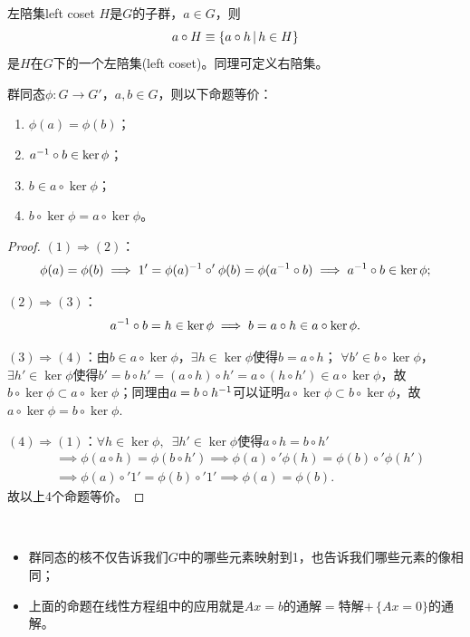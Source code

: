 \begin{definition}{左陪集}{left coset}
	$H$是$G$的子群，$a \in G$，则
	\begin{equation}
		a \circ H \equiv \{a \circ h\,\vert\,h \in H\}
	\end{equation}
	是$H$在$G$下的一个左陪集(left coset)。同理可定义右陪集。
\end{definition}
\begin{theorem}{}{}
	群同态$\phi:G \to G'$，$a,b \in G$，则以下命题等价：
	\begin{enumerate}
		\item $\phi(a) = \phi(b)$；
		\item $a^{-1} \circ b \in \ker\phi$；
		\item $b \in a \circ \ker\phi$；
		\item $b \circ \ker\phi = a \circ \ker\phi$。
	\end{enumerate}
\end{theorem}
\begin{proof}
	$(1) \Rightarrow (2)$：
	\[
		\phi(a) = \phi(b) \implies 1' = \phi(a)^{-1} \circ '\phi(b) = \phi(a^{-1} \circ b) \implies a^{-1} \circ b \in \ker\phi;
	\]

	$(2) \Rightarrow (3)$：
	\[
		a^{-1} \circ b = h \in \ker\phi \implies b = a \circ h \in a \circ \ker\phi.
	\]

	$(3) \Rightarrow (4)$：由$b \in a \circ \ker\phi$，$\exists h \in \ker\phi$使得$b = a \circ h$；
	$\forall b' \in b \circ \ker\phi$，$\exists h' \in \ker\phi$使得$b' = b \circ h' = (a \circ h) \circ h' = a \circ (h \circ h') \in a \circ \ker\phi$，故$b \circ \ker\phi \subset a \circ \ker\phi$；同理由$a = b \circ h^{-1}$可以证明$a \circ \ker\phi \subset b \circ \ker\phi$，故$a \circ \ker\phi = b \circ \ker\phi.$

	$(4) \Rightarrow (1)$：$\forall h \in \ker\phi,\enspace\exists h' \in \ker\phi$使得$a \circ h = b \circ h'$
	\begin{align*}
		&\implies \phi(a \circ h) = \phi(b \circ h') \implies \phi(a) \circ '\phi(h) = \phi(b) \circ '\phi(h')\\
		&\implies \phi(a) \circ '1' = \phi(b) \circ '1' \implies \phi(a) = \phi(b).
	\end{align*}
	故以上4个命题等价。
\end{proof}
\begin{remark}~
	\begin{itemize}
		\item 群同态的核不仅告诉我们$G$中的哪些元素映射到1，也告诉我们哪些元素的像相同；
		\item 上面的命题在线性方程组中的应用就是$Ax = b$的通解$=$特解$+\,\{Ax = 0\}$的通解。
	\end{itemize}
\end{remark}
